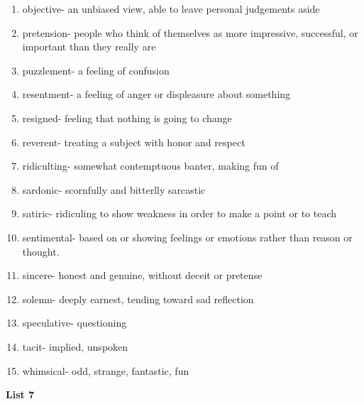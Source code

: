 \begin{enumerate}

\item objective- an unbiased view, able to leave personal judgements aside

\item pretension- people who think of themselves as more impressive, successful, or important than they really are

\item puzzlement- a feeling of confusion

\item resentment- a feeling of anger or displeasure about something

\item resigned- feeling that nothing is going to change

\item reverent- treating a subject with honor and respect

\item ridiculting- somewhat contemptuous banter, making fun of

\item sardonic- scornfully and bitterlly sarcastic

\item satiric- ridiculing to show weakness in order to make a point or to teach

\item sentimental- based on or showing feelings or emotions rather than reason or thought. 

\item sincere- honest and genuine, without deceit or pretense

\item solemn- deeply earnest, tending toward sad reflection

\item speculative- questioning

\item tacit- implied, unspoken

\item whimsical- odd, strange, fantastic, fun

\end{enumerate}

\textbf{List 7}

